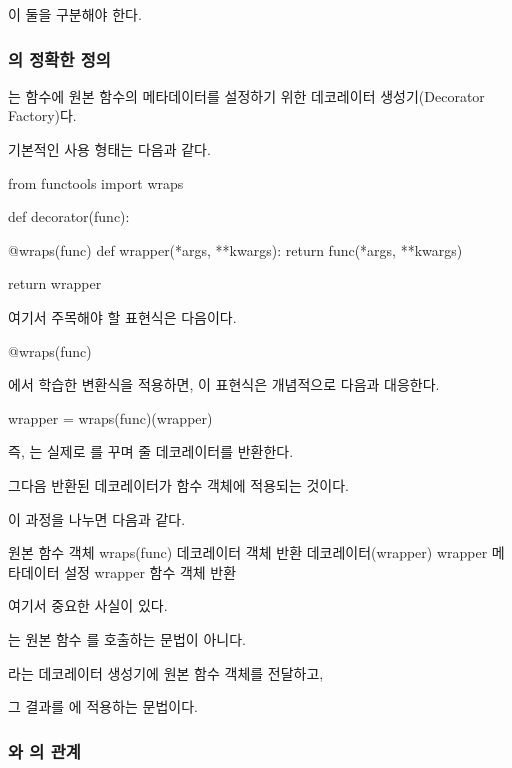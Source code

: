이 둘을 구분해야 한다.

\subsubsection{의 정확한 정의}

는  함수에 원본 함수의 메타데이터를 설정하기 위한 데코레이터 생성기(Decorator Factory)다.

기본적인 사용 형태는 다음과 같다.

\begin{dhkcode}
from functools import wraps

def decorator(func):

    @wraps(func)
    def wrapper(*args, **kwargs):
        return func(*args, **kwargs)

    return wrapper
\end{dhkcode}

여기서 주목해야 할 표현식은 다음이다.

\begin{dhkcode}
@wraps(func)
\end{dhkcode}

에서 학습한 변환식을 적용하면, 이 표현식은 개념적으로 다음과 대응한다.

\begin{dhkcode}
wrapper = wraps(func)(wrapper)
\end{dhkcode}

즉, 는 실제로 를 꾸며 줄 데코레이터를 반환한다.

그다음 반환된 데코레이터가  함수 객체에 적용되는 것이다.

이 과정을 나누면 다음과 같다.

\begin{dhksmry}[centered]
원본 함수 객체
\da
wraps(func)
\da
데코레이터 객체 반환
\da
데코레이터(wrapper)
\da
wrapper 메타데이터 설정
\da
wrapper 함수 객체 반환
\end{dhksmry}

여기서 중요한 사실이 있다.

는 원본 함수 를 호출하는 문법이 아니다.

라는 데코레이터 생성기에 원본 함수 객체를 전달하고,

그 결과를 에 적용하는 문법이다.

\subsubsection{와 의 관계}

